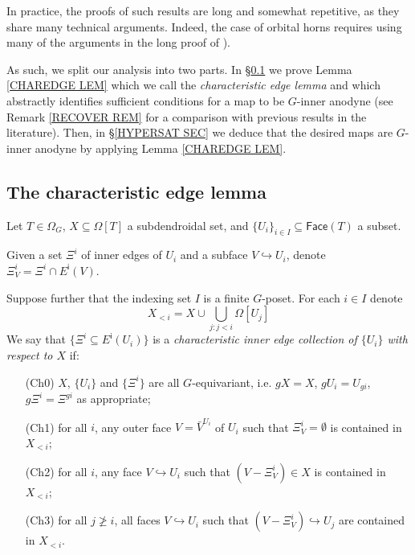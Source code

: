 \documentclass[a4paper,10pt,draft]{article}%
\begin{document}
In practice, the proofs of such results are long and somewhat repetitive, as they share many technical arguments.
Indeed, the case of orbital horns requires using many of the arguments in the long proof of \cite[Thm 7.1]{Per17}).

As such, we split our analysis into two parts.
In \S \ref{CHAREDGE SEC} we prove Lemma \ref{CHAREDGE LEM} which  we call the \textit{characteristic edge lemma} and
which abstractly identifies sufficient conditions for a map to be $G$-inner anodyne
(see Remark \ref{RECOVER REM} for a comparison with previous results in the literature).
Then, in \S \ref{HYPERSAT SEC} we deduce that the desired maps
are $G$-inner anodyne by applying Lemma \ref{CHAREDGE LEM}.



\subsection{The characteristic edge lemma} \label{CHAREDGE SEC}

\begin{definition}\label{CHAREDGE DEF}
      Let $T \in \Omega_G$, $X \subseteq \Omega[T]$ a subdendroidal set, and $\{U_i\}_{i \in I} \subseteq \mathsf{Face}(T)$ a subset.

      Given a set $\Xi^i$ of inner edges of $U_i$ and a subface $V \hookrightarrow U_i$, denote $\Xi_V^i = \Xi^i \cap E^{\mathsf{i}}(V)$.

      Suppose further that the indexing set $I$ is a 
      finite $G$-poset. For each $i \in I$ denote
      \[
            X_{<i} = X \cup \bigcup_{j \colon j<i} \Omega[U_j]
      \]
      We say that $\{\Xi^i \subseteq E^{\mathsf{i}}(U_i)\}$ 
      is a \textit{characteristic inner edge collection of $\{U_i\}$ with respect to $X$} if:
      \begin{itemize}
      \item[(Ch0)] $X$, $\{U_i\}$ and $\{\Xi^i\}$ are all $G$-equivariant, i.e. $g X = X$, $g U_i = U_{gi}$, $g \Xi^i = \Xi^{gi}$ as appropriate; 
      \item[(Ch1)] for all $i$, any outer face $V = \bar{V}^{U_i}$
            of $U_i$ such that $\Xi_{V}^i = \emptyset$
            is contained in $X_{<i}$;
      \item[(Ch2)] for all $i$, any face
            $V \hookrightarrow U_i$ such that $(V-\Xi_V^i) \in X$
            is contained in $X_{<i}$;
      \item[(Ch3)] for all $j \not \geq i$, 
            all faces $V \hookrightarrow U_i$ such that 
            $(V-\Xi^i_V) \hookrightarrow U_j$
            are contained in $X_{<i}$.
      \end{itemize}
\end{definition}
\end{document}
